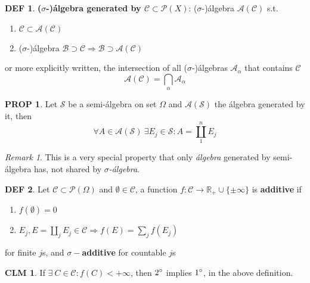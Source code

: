 \documentclass[hidelinks]{article}
\theoremstyle{definition}
\newtheorem*{defin}{DEF}
\theoremstyle{dotless}
\newtheorem{proposition}{PROP}[section]
\newtheorem{claim}{CLM}[section]
\theoremstyle{remark}
\newtheorem*{remark}{Remark}
\begin{document}
\begin{defin}
\textbf{($\sigma$-)álgebra generated by $\mathscr{C}\subset\mathscr{P}(X)$}: ($\sigma$-)álgebra $\mathscr{A}(\mathscr{C})$ s.t.
\begin{enumerate}[label=\arabic*\degree]
    \item $\mathscr{C}\subset\mathscr{A}(\mathscr{C})$
    \item ($\sigma$-)álgebra $\mathscr{B}\supset\mathscr{C}\Rightarrow\mathscr{B}\supset\mathscr{A}(\mathscr{C})$
\end{enumerate}
or more explicitly written, the intersection of all ($\sigma$-)álgebras $\mathscr{A}_\alpha$ that contains $\mathscr{C}$
\[\mathscr{A}(\mathscr{C})=\bigcap\limits_\alpha\mathscr{A}_\alpha\]
\end{defin}

\begin{proposition}\label{Prop 1.1}
Let $\mathscr{S}$ be a semi-álgebra on set $\Omega$ and $\mathscr{A}(\mathscr{S})$ the álgebra generated by it, then
\[\forall A\in\mathscr{A}(\mathscr{S})\ \exists E_j\in\mathscr{S}:A=\coprod_1^nE_j \]
\end{proposition}

\begin{remark}
This is a very special property that only \emph{álgebra} generated by semi-álgebra has, not shared by \emph{$\sigma$-álgebra}.
\end{remark}

\begin{defin}
Let $\mathscr{C}\subset\mathscr{P}(\Omega)$ and $\emptyset\in\mathscr{C}$, a function $f:\mathscr{C}\to\mathbb{R}_+\cup\{\pm\infty\}$ is \textbf{additive} if
\begin{enumerate}[label=\arabic*\degree]
    \item $f(\emptyset)=0$
    \item $E_j,E=\coprod\limits_jE_j\in\mathscr{C}\Rightarrow f(E)=\sum\limits_jf(E_j)$
\end{enumerate} for finite $j$s, and \textbf{$\sigma-$additive} for countable $j$s
\end{defin}

\begin{claim}
If $\exists\ C\in\mathscr{C}:f(C)<+\infty$, then $2\degree$ implies $1\degree$, in the above definition.
\end{claim}
\end{document}
